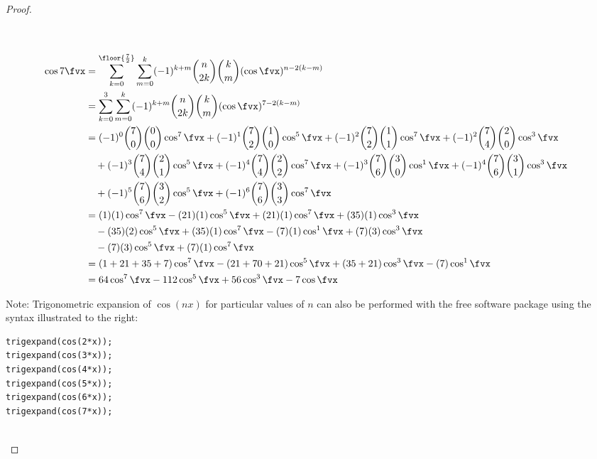 \begin{proof}
\begin{align*}
\\
\\
  \cos7\fvx
    &= \sum_{k=0}^\floor{\frac{7}{2}}\sum_{m=0}^k      
         (-1)^{k+m}\binom{n}{2k}\binom{k}{m} (\cos\fvx)^{n-2(k-m)}
  \\&= \sum_{k=0}^3 \sum_{m=0}^k      
         (-1)^{k+m}\binom{n}{2k}\binom{k}{m} (\cos\fvx)^{7-2(k-m)}
  \\&= (-1)^0\binom{7}{0}\binom{0}{0}\cos^7\fvx +
       (-1)^1\binom{7}{2}\binom{1}{0}\cos^5\fvx +
       (-1)^2\binom{7}{2}\binom{1}{1}\cos^7\fvx + 
       (-1)^2\binom{7}{4}\binom{2}{0}\cos^3\fvx \\&\quad+ 
       (-1)^3\binom{7}{4}\binom{2}{1}\cos^5\fvx + 
       (-1)^4\binom{7}{4}\binom{2}{2}\cos^7\fvx + 
       (-1)^3\binom{7}{6}\binom{3}{0}\cos^1\fvx +
       (-1)^4\binom{7}{6}\binom{3}{1}\cos^3\fvx \\&\quad+
       (-1)^5\binom{7}{6}\binom{3}{2}\cos^5\fvx +
       (-1)^6\binom{7}{6}\binom{3}{3}\cos^7\fvx
  \\&=   ( 1)(1)\cos^7\fvx 
       - (21)(1)\cos^5\fvx 
       + (21)(1)\cos^7\fvx  
       + (35)(1)\cos^3\fvx \\&\quad 
       - (35)(2)\cos^5\fvx 
       + (35)(1)\cos^7\fvx  
       - ( 7)(1)\cos^1\fvx 
       + ( 7)(3)\cos^3\fvx \\&\quad
       - ( 7)(3)\cos^5\fvx
       + ( 7)(1)\cos^7\fvx
  \\&=   (1+21+35+7)\cos^7\fvx 
       - (21+70+21)\cos^5\fvx 
       + (35+21)\cos^3\fvx  
       - ( 7)\cos^1\fvx 
  \\&= 64\cos^7\fvx - 112\cos^5\fvx + 56\cos^3\fvx - 7\cos\fvx 
\end{align*}

\begin{minipage}{\tw-67mm}%
  Note: Trigonometric expansion of $\cos(nx)$ for particular values of $n$ 
  can also be performed with the free software package 
      \href{http://maxima.sourceforge.net/}{\texttrademark} using the syntax illustrated to the right:\footnotemark
\end{minipage}%
\hspace{10mm}%
\begin{minipage}{48mm}
\begin{lstlisting}  
trigexpand(cos(2*x));
trigexpand(cos(3*x));
trigexpand(cos(4*x));
trigexpand(cos(5*x));
trigexpand(cos(6*x));
trigexpand(cos(7*x));
\end{lstlisting}
\end{minipage}%
\mbox{}\\


\end{proof}


